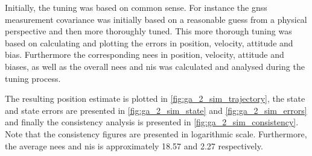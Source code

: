 
Initially, the tuning was based on common sense. For instance the \acrshort{gnss} measurement covariance was initially based on a reasonable guess from a physical perspective and then more thoroughly tuned. This more thorough tuning was based on calculating and plotting the errors in position, velocity, attitude and bias. Furthermore the corresponding \acrshort{nees} in position, velocity, attitude and biases, as well as the overall \acrshort{nees} and \acrshort{nis} was calculated and analysed during the tuning process. 

The resulting position estimate is plotted in \cref{fig:ga_2_sim_trajectory}, the state and state errors are presented in \cref{fig:ga_2_sim_state} and \cref{fig:ga_2_sim_errors} and finally the consistency analysis is presented in \cref{fig:ga_2_sim_consistency}. Note that the consistency figures are presented in logarithmic scale. Furthermore, the average \acrshort{nees} and \acrshort{nis} is approximately 18.57 and 2.27 respectively.

